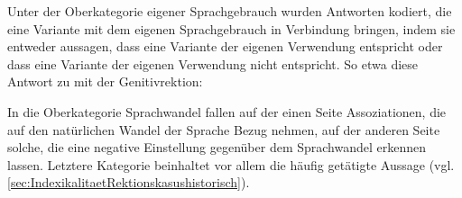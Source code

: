 Unter der Oberkategorie \glqq eigener Sprachgebrauch\grqq{} wurden Antworten kodiert, die eine Variante mit dem eigenen Sprachgebrauch in Verbindung bringen, indem sie entweder aussagen, dass eine Variante der eigenen Verwendung entspricht oder dass eine Variante der eigenen Verwendung nicht entspricht. 
So etwa diese Antwort zu \dank{} mit der Genitivrektion: 
\begin{exe}
\ex {}
\end{exe}
In die Oberkategorie \glqq Sprachwandel\grqq{} fallen auf der einen Seite Assoziationen, die auf den natürlichen Wandel der Sprache Bezug nehmen, auf der anderen Seite solche, die eine negative Einstellung gegenüber dem Sprachwandel erkennen lassen. 
Letztere Kategorie beinhaltet vor allem die häufig getätigte Aussage  (vgl. \autoref{sec:IndexikalitaetRektionskasushistorisch}).

